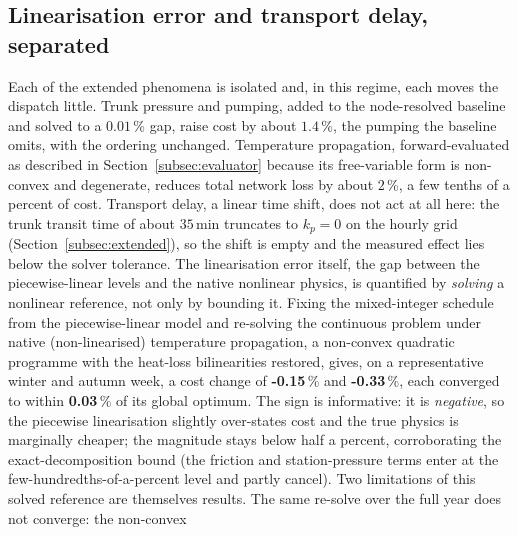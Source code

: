 \documentclass[a4paper,fleqn]{cas-sc}
\begin{document}
\subsection{Linearisation error and transport delay, separated}
\label{subsec:linearisation}
Each of the extended phenomena is isolated and, in this regime, each moves the dispatch little.
Trunk pressure and pumping, added to the node-resolved baseline and solved to a $0.01$\,\%
gap, raise cost by about $1.4$\,\%, the pumping the baseline omits, with the ordering
unchanged. Temperature propagation, forward-evaluated as described in
Section~\ref{subsec:evaluator} because its free-variable form is non-convex and degenerate,
reduces total network loss by about $2$\,\%, a few tenths of a percent of cost.
Transport delay, a linear time shift, does not act at all here: the trunk transit
time of about $35$\,min truncates to $k_p = 0$ on the hourly grid
(Section~\ref{subsec:extended}), so the shift is empty and the measured effect lies below the
solver tolerance. The linearisation error itself, the gap between the piecewise-linear levels and
the native nonlinear physics, is quantified by \emph{solving} a nonlinear reference, not only by
bounding it. Fixing the mixed-integer schedule from the piecewise-linear model and re-solving the
continuous problem under native (non-linearised) temperature propagation, a non-convex quadratic
programme with the heat-loss bilinearities restored, gives, on a representative winter and autumn
week, a cost change of \textbf{-0.15}\,\% and \textbf{-0.33}\,\%,
each converged to within \textbf{0.03}\,\% of its global optimum. The sign is
informative: it is \emph{negative}, so the piecewise linearisation slightly over-states cost and
the true physics is marginally cheaper; the magnitude stays below half a percent, corroborating
the exact-decomposition bound (the friction and station-pressure terms enter at the
few-hundredths-of-a-percent level and partly cancel). Two limitations of this solved reference are
themselves results. The same re-solve over the full year does not converge: the non-convex
\end{document}
